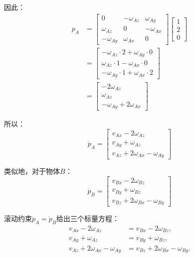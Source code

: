 \documentclass[12pt,a4paper]{article}
\begin{document}
因此：
\begin{align}
[\omega_A] p_A &= \begin{bmatrix} 0 & -\omega_{Az} & \omega_{Ay} \\ \omega_{Az} & 0 & -\omega_{Ax} \\ -\omega_{Ay} & \omega_{Ax} & 0 \end{bmatrix} \begin{bmatrix} 1 \\ 2 \\ 0 \end{bmatrix} \\
&= \begin{bmatrix} -\omega_{Az} \cdot 2 + \omega_{Ay} \cdot 0 \\ \omega_{Az} \cdot 1 - \omega_{Ax} \cdot 0 \\ -\omega_{Ay} \cdot 1 + \omega_{Ax} \cdot 2 \end{bmatrix} \\
&= \begin{bmatrix} -2\omega_{Az} \\ \omega_{Az} \\ -\omega_{Ay} + 2\omega_{Ax} \end{bmatrix}
\end{align}

所以：
\begin{equation}
\dot{p}_A = \begin{bmatrix} v_{Ax} - 2\omega_{Az} \\ v_{Ay} + \omega_{Az} \\ v_{Az} + 2\omega_{Ax} - \omega_{Ay} \end{bmatrix}
\end{equation}

类似地，对于物体$B$：
\begin{equation}
\dot{p}_B = \begin{bmatrix} v_{Bx} - 2\omega_{Bz} \\ v_{By} + \omega_{Bz} \\ v_{Bz} + 2\omega_{Bx} - \omega_{By} \end{bmatrix}
\end{equation}

滚动约束$\dot{p}_A = \dot{p}_B$给出三个标量方程：
\begin{align}
v_{Ax} - 2\omega_{Az} &= v_{Bx} - 2\omega_{Bz}, \label{eq:12.10} \\
v_{Ay} + \omega_{Az} &= v_{By} + \omega_{Bz}, \label{eq:12.11} \\
v_{Az} + 2\omega_{Ax} - \omega_{Ay} &= v_{Bz} + 2\omega_{Bx} - \omega_{By}. \label{eq:12.12}
\end{align}
\end{document}

